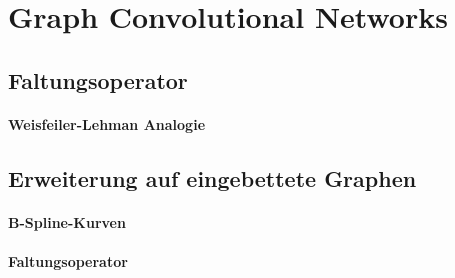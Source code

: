 \section{Graph Convolutional Networks}
\label{graph_convolutional_networks}

\subsection{Faltungsoperator}
\label{gcn_faltungsoperator}

\paragraph{Weisfeiler-Lehman Analogie}
\label{weisfeiler_lehman_analogie}

\subsection{Erweiterung auf eingebettete Graphen}
\label{gcn_erweiterung}

\paragraph{B-Spline-Kurven}
\label{bspline}

\paragraph{Faltungsoperator}
\label{eingebetteter_faltungsoperator}
